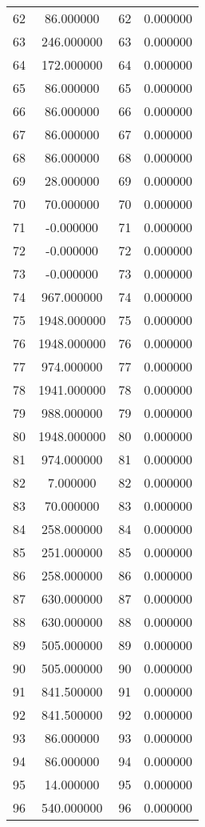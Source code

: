 \documentclass[12pt]{article}
\begin{document}
\begin{longtable}{@{}cccc@{}}
62 & 86.000000 & 62 & 0.000000 \\
63 & 246.000000 & 63 & 0.000000 \\
64 & 172.000000 & 64 & 0.000000 \\
65 & 86.000000 & 65 & 0.000000 \\
66 & 86.000000 & 66 & 0.000000 \\
67 & 86.000000 & 67 & 0.000000 \\
68 & 86.000000 & 68 & 0.000000 \\
69 & 28.000000 & 69 & 0.000000 \\
70 & 70.000000 & 70 & 0.000000 \\
71 & -0.000000 & 71 & 0.000000 \\
72 & -0.000000 & 72 & 0.000000 \\
73 & -0.000000 & 73 & 0.000000 \\
74 & 967.000000 & 74 & 0.000000 \\
75 & 1948.000000 & 75 & 0.000000 \\
76 & 1948.000000 & 76 & 0.000000 \\
77 & 974.000000 & 77 & 0.000000 \\
78 & 1941.000000 & 78 & 0.000000 \\
79 & 988.000000 & 79 & 0.000000 \\
80 & 1948.000000 & 80 & 0.000000 \\
81 & 974.000000 & 81 & 0.000000 \\
82 & 7.000000 & 82 & 0.000000 \\
83 & 70.000000 & 83 & 0.000000 \\
84 & 258.000000 & 84 & 0.000000 \\
85 & 251.000000 & 85 & 0.000000 \\
86 & 258.000000 & 86 & 0.000000 \\
87 & 630.000000 & 87 & 0.000000 \\
88 & 630.000000 & 88 & 0.000000 \\
89 & 505.000000 & 89 & 0.000000 \\
90 & 505.000000 & 90 & 0.000000 \\
91 & 841.500000 & 91 & 0.000000 \\
92 & 841.500000 & 92 & 0.000000 \\
93 & 86.000000 & 93 & 0.000000 \\
94 & 86.000000 & 94 & 0.000000 \\
95 & 14.000000 & 95 & 0.000000 \\
96 & 540.000000 & 96 & 0.000000 \\

\end{longtable}
\end{document}
